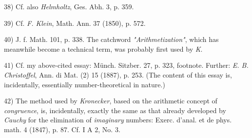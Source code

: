 \vfill
\leftline{\rule{2in}{0.4pt}}
\vspace{0.2cm}
{
\footnotesize
38) Cf. also \textit{Helmholtz}, Ges. Abh. 3, p. 359.

39) Cf. \textit{F. Klein}, Math. Ann. 37 (1850), p. 572.

40) J. f. Math. 101, p. 338. The catchword \textit{"Arithmetization"}, which has meanwhile become a technical term, was probably first used by \textit{K}.

41) Cf. my above-cited essay: Münch. Sitzber. 27, p. 323, footnote. Further: \textit{E. B. Christoffel}, Ann. di Mat. (2) 15 (1887), p. 253. (The content of this essay is, incidentally, essentially number-theoretical in nature.)

42) The method used by \textit{Kronecker}, based on the arithmetic concept of \textit{congruence}, is, incidentally, exactly the same as that already developed by \textit{Cauchy} for the elimination of \textit{imaginary} numbers: Exerc. d'anal. et de phys. math. 4 (1847), p. 87. Cf. I A 2, No. 3.

}